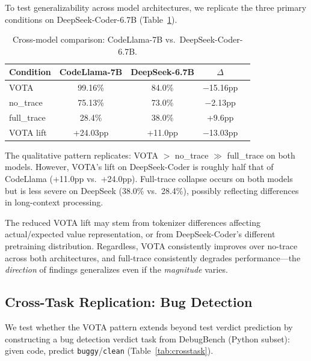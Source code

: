 \documentclass[11pt]{article}
\begin{document}
To test generalizability across model architectures, we replicate the three primary conditions on DeepSeek-Coder-6.7B (Table~\ref{tab:crossmodel}).

\begin{table}[h]
\centering
\caption{Cross-model comparison: CodeLlama-7B vs.\ DeepSeek-Coder-6.7B.}
\label{tab:crossmodel}
\begin{tabular}{lcccc}
\toprule
\textbf{Condition} & \textbf{CodeLlama-7B} & \textbf{DeepSeek-6.7B} & \textbf{$\Delta$} \\
\midrule
VOTA       & 99.16\% & 84.0\%  & $-$15.16pp \\
no\_trace  & 75.13\% & 73.0\%  & $-$2.13pp  \\
full\_trace & 28.4\% & 38.0\%  & +9.6pp    \\
\midrule
VOTA lift  & +24.03pp & +11.0pp & $-$13.03pp \\
\bottomrule
\end{tabular}
\end{table}

The qualitative pattern replicates: VOTA $>$ no\_trace $\gg$ full\_trace on both models. However, VOTA's lift on DeepSeek-Coder is roughly half that of CodeLlama (+11.0pp vs.\ +24.0pp). Full-trace collapse occurs on both models but is less severe on DeepSeek (38.0\% vs.\ 28.4\%), possibly reflecting differences in long-context processing.

The reduced VOTA lift may stem from tokenizer differences affecting actual/expected value representation, or from DeepSeek-Coder's different pretraining distribution. Regardless, VOTA consistently improves over no-trace across both architectures, and full-trace consistently degrades performance---the \emph{direction} of findings generalizes even if the \emph{magnitude} varies.

\subsection{Cross-Task Replication: Bug Detection}
\label{sec:bugtask}

We test whether the VOTA pattern extends beyond test verdict prediction by constructing a bug detection verdict task from DebugBench (Python subset): given code, predict \texttt{buggy}/\texttt{clean} (Table~\ref{tab:crosstask}).
\end{document}
